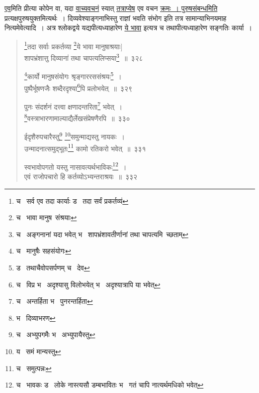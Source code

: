 \documentclass[11pt, openany]{book}
\begin{document}
\vspace{2mm}
\begin{sloppypar}
\noindent
\underline{एव}मिति प्रीत्या कोपेन वा, यदा \underline{वाच्यवचनं} स्यात् \underline{तत्राप्येष} एव वचन \underline{क्रमः~। पुरुषसंबन्धमिति} प्रत्यक्षपुरुषयुक्तमित्यर्थः~। दिव्यवेश्याङ्गनाभिस्तु राज्ञां भवति संभोग इति तत्र सामान्याभिनयमाह नित्यमेवेत्यादि~। अत्र श्लोकद्वये यद्यपीत्यध्याहारेण \underline{ये भावा} इत्यत्र च तथापीत्यध्याहारेण सङ्गतिः कार्या~।
\end{sloppypar}


\newpage

\begin{quote}
{\na \renewcommand{\thefootnote}{1}\footnote{च \textendash\  सर्व एव तदा कार्याः ड \textendash\  तदा सर्वं प्रकर्तव्यं}तदा सर्वाः प्रकर्तव्या \renewcommand{\thefootnote}{2}\footnote{च \textendash\  भावा मानुष\textendash\ संश्रयाः}ये भावा मानुषाश्रयाः]\\
शापभ्रंशात्तु दिव्यानां तथा चापत्यलिप्सया\renewcommand{\thefootnote}{3}\footnote{च \textendash\  अङ्गनानां यदा भवेत् भ \textendash\  शापभ्रंशावतीर्णानां तथा चापत्यमि\textendash\ च्छताम्}~॥~३२८

\renewcommand{\thefootnote}{4}\footnote{च \textendash\  मानुषैः सहसंयोगः}कार्यो मानुषसंयोगः श्रृङ्गाररससंश्रयः\renewcommand{\thefootnote}{5}\footnote{ड \textendash\  तथाचैवोपसर्पणम् च \textendash\  देव}~।\\
पुष्पैर्भूषणजैः शब्दैरदृश्या\renewcommand{\thefootnote}{6}\footnote{च \textendash\  विप्र भ \textendash\  अदृश्यासु विलोभयेत् भ \textendash\  अदृश्यात्रापि या भवेत्}पि प्रलोभयेत्~॥~३२९

पुनः संदर्शनं दत्त्वा क्षणादन्तरिता\renewcommand{\thefootnote}{7}\footnote{च \textendash\  अन्तर्हिता भ \textendash\  पुनरन्तर्हिता} भवेत्~।\\
\renewcommand{\thefootnote}{8}\footnote{भ \textendash\  दिव्याभरण}वस्त्राभारणामाल्याद्यैर्लेखसंप्रेषणैरपि~॥~३३०

ईदृशैरुपचारैस्तु\renewcommand{\thefootnote}{9}\footnote{च \textendash\  अभ्युपगमैः भ \textendash\  अभ्युपायैस्तु} \renewcommand{\thefootnote}{10}\footnote{य \textendash\  समं मान्यस्तु}समुन्माद्यस्तु नायकः~।\\
उन्मादनात्समुद्भूतः\renewcommand{\thefootnote}{11}\footnote{च \textendash\  समुत्पन्नः} कामो रतिकरो भवेत्~॥~३३१

स्वभावोपगतो यस्तु नासावत्यर्थभाविकः\renewcommand{\thefootnote}{12}\footnote{च \textendash\  भावकः ड \textendash\  लोके नास्त्यसौ डम्बभावितः भ \textendash\  गतं चापि नात्यर्थमधिको भवेत्}~।\\
एवं राजोपचारो हि कर्तव्योऽभ्यन्तराश्रयः~॥~३३२}
\end{quote}
\end{document}
